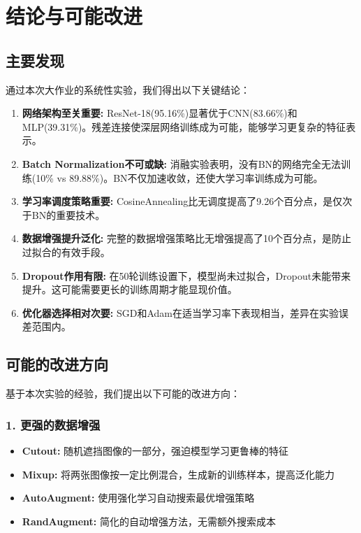 \documentclass[12pt,a4paper]{article}
\begin{document}
\section{结论与可能改进}

\subsection{主要发现}

通过本次大作业的系统性实验，我们得出以下关键结论：

\begin{enumerate}[leftmargin=2em]
    \item \textbf{网络架构至关重要:} ResNet-18(95.16\%)显著优于CNN(83.66\%)和MLP(39.31\%)。残差连接使深层网络训练成为可能，能够学习更复杂的特征表示。
    
    \item \textbf{Batch Normalization不可或缺:} 消融实验表明，没有BN的网络完全无法训练(10\% vs 89.88\%)。BN不仅加速收敛，还使大学习率训练成为可能。
    
    \item \textbf{学习率调度策略重要:} CosineAnnealing比无调度提高了9.26个百分点，是仅次于BN的重要技术。
    
    \item \textbf{数据增强提升泛化:} 完整的数据增强策略比无增强提高了10个百分点，是防止过拟合的有效手段。
    
    \item \textbf{Dropout作用有限:} 在50轮训练设置下，模型尚未过拟合，Dropout未能带来提升。这可能需要更长的训练周期才能显现价值。
    
    \item \textbf{优化器选择相对次要:} SGD和Adam在适当学习率下表现相当，差异在实验误差范围内。
\end{enumerate}

\subsection{可能的改进方向}

基于本次实验的经验，我们提出以下可能的改进方向：

\subsubsection{1. 更强的数据增强}

\begin{itemize}[leftmargin=2em]
    \item \textbf{Cutout:} 随机遮挡图像的一部分，强迫模型学习更鲁棒的特征
    \item \textbf{Mixup:} 将两张图像按一定比例混合，生成新的训练样本，提高泛化能力
    \item \textbf{AutoAugment:} 使用强化学习自动搜索最优增强策略
    \item \textbf{RandAugment:} 简化的自动增强方法，无需额外搜索成本
\end{itemize}
\end{document}
